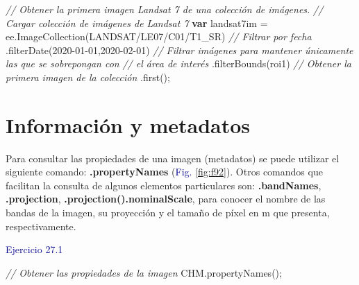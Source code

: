 \documentclass[
  12pt,
  letterpaper,
  twoside]{book}
\newenvironment{Shaded}{\begin{snugshade}}{\end{snugshade}}
\newcommand{\CommentTok}[1]{\textcolor[rgb]{0.24,0.58,0.00}{\textit{#1}}}
\newcommand{\ControlFlowTok}[1]{\textcolor[rgb]{0.00,0.00,0.00}{\textbf{#1}}}
\newcommand{\FunctionTok}[1]{\textcolor[rgb]{0.48,0.12,0.64}{#1}}
\newcommand{\KeywordTok}[1]{\textcolor[rgb]{0.48,0.12,0.64}{#1}}
\newcommand{\NormalTok}[1]{#1}
\newcommand{\OperatorTok}[1]{\textcolor[rgb]{0.00,0.00,0.00}{#1}}
\newcommand{\StringTok}[1]{\textcolor[rgb]{0.87,0.29,0.22}{#1}}
\newcommand\boldpurple[1]{\textcolor{darkpurple}{\textbf{#1}}}
\begin{document}
\begin{Shaded}
\begin{Highlighting}[]
\CommentTok{// Obtener la primera imagen Landsat 7 de una colección de imágenes.}
\CommentTok{// Cargar colección de imágenes de Landsat 7          }
\ControlFlowTok{var}\NormalTok{ landsat7im }\OperatorTok{=} \KeywordTok{ee}\OperatorTok{.}\FunctionTok{ImageCollection}\NormalTok{(}\StringTok{\textquotesingle{}LANDSAT/LE07/C01/T1\_SR\textquotesingle{}}\NormalTok{)}
  \CommentTok{// Filtrar por fecha}
  \OperatorTok{.}\FunctionTok{filterDate}\NormalTok{(}\StringTok{\textquotesingle{}2020{-}01{-}01\textquotesingle{}}\OperatorTok{,}\StringTok{\textquotesingle{}2020{-}02{-}01\textquotesingle{}}\NormalTok{)}
  \CommentTok{// Filtrar imágenes para mantener únicamente las que se sobrepongan con }
  \CommentTok{// el área de interés}
  \OperatorTok{.}\FunctionTok{filterBounds}\NormalTok{(roi1)}
  \CommentTok{// Obtener la primera imagen de la colección}
  \OperatorTok{.}\FunctionTok{first}\NormalTok{()}\OperatorTok{;}
\end{Highlighting}
\end{Shaded}

\hypertarget{informaciuxf3n-y-metadatos-3}{%
\section{Información y metadatos}\label{informaciuxf3n-y-metadatos-3}}

Para consultar las propiedades de una imagen (metadatos) se puede utilizar el siguiente comando: \boldpurple{.propertyNames} (\textcolor{darkblue}{Fig.} \ref{fig:f92}). Otros comandos que facilitan la consulta de algunos elementos particulares son: \boldpurple{.bandNames}, \boldpurple{.projection}, \boldpurple{.projection().nominalScale}, para conocer el nombre de las bandas de la imagen, su proyección y el tamaño de píxel en m que presenta, respectivamente.

\textcolor{darkblue}{Ejercicio 27.1}

\begin{Shaded}
\begin{Highlighting}[]
\CommentTok{// Obtener las propiedades de la imagen}
\NormalTok{CHM}\OperatorTok{.}\FunctionTok{propertyNames}\NormalTok{()}\OperatorTok{;}
\end{Highlighting}
\end{Shaded}
\end{document}
